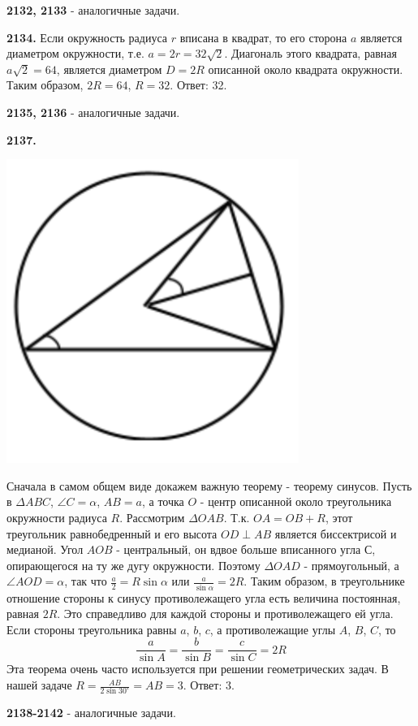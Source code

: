 \textbf{2132, 2133} - аналогичные задачи.

\textbf{2134.} Если окружность радиуса $r$ вписана в  квадрат, то его сторона $a$ является диаметром окружности, т.е. $a=2r=32\sqrt{2}$. Диагональ этого квадрата, равная $a\sqrt{2}=64$, является диаметром $D=2R$ описанной около квадрата окружности. Таким образом, $2R=64$, $R=32$. \newline \null \hspace*{\fill} Ответ: 32.

\textbf{2135, 2136} - аналогичные задачи.

\textbf{2137.}

{\centering \includegraphics[width=0.4\linewidth]{Geometry/Content/42.png}
	
}

Сначала в самом общем виде докажем важную теорему - теорему синусов.  Пусть в $\Delta ABC$, $\angle C = \alpha$, $AB=a$, а точка $O$ - центр описанной около треугольника окружности радиуса $R$. Рассмотрим $\Delta OAB$. Т.к. $OA=OB+R$, этот треугольник равнобедренный и его высота $OD \perp AB$ является биссектрисой и медианой. Угол $AOB$ - центральный, он вдвое больше вписанного угла $С$, опирающегося на ту же дугу окружности. Поэтому $\Delta OAD$ - прямоугольный, а $\angle AOD=\alpha$, так что $\frac{a}{2}=R\sin{\alpha}$ или $\frac{a}{\sin{\alpha}}=2R$. Таким образом, в треугольнике отношение стороны к синусу противолежащего угла есть величина постоянная, равная $2R$. Это справедливо для  каждой стороны и противолежащего ей угла. Если стороны треугольника равны $a$, $b$, $c$, а противолежащие углы $A$, $B$, $C$, то 
\[
\frac{a}{\sin{A}}=\frac{b}{\sin{B}}=\frac{c}{\sin{C}}=2R
\]
Эта теорема очень часто используется при решении геометрических задач. В нашей задаче $R = \frac{AB}{2\sin{30^\circ}}=AB=3$. \newline \null \hspace*{\fill} Ответ: 3.

\textbf{2138-2142} - аналогичные задачи.

